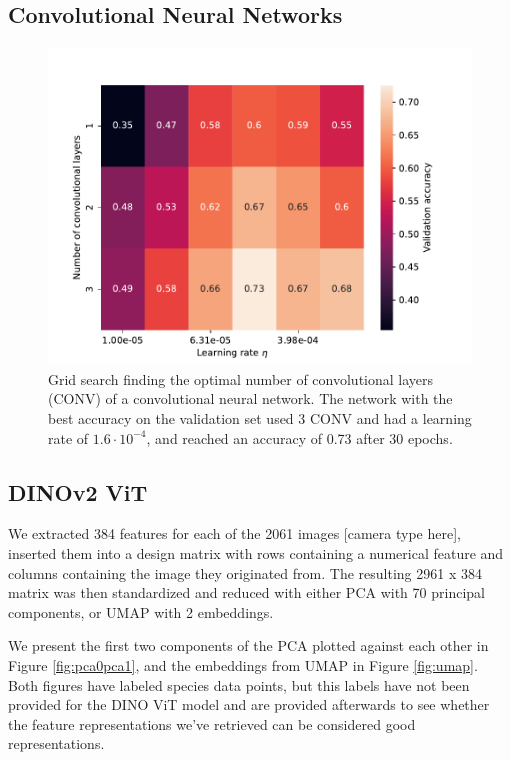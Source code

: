 
\subsection{Convolutional Neural Networks}

\begin{figure}
    \centering
    \includegraphics[width=0.5\linewidth]{examples/tests_even/figs/gridsearch-nconv-128-2024-12-12_1108.pdf}
    \caption{Grid search finding the optimal number of convolutional layers (CONV) of a convolutional neural network. The network with the best accuracy on the validation set used 3 CONV and had a learning rate of $1.6 \cdot 10^{-4}$, and reached an accuracy of 0.73 after 30 epochs.}
    \label{fig:gridsearch-nconv}
\end{figure}

\begi

%
%
\subsection{DINOv2 ViT}
We extracted 384 features for each of the 2061 images [camera type here], inserted them into a design matrix with rows containing a numerical feature and columns containing the image they originated from. The resulting 2961 x 384 matrix was then standardized and reduced with either PCA with 70 principal components, or UMAP with 2 embeddings. 

We present the first two components of the PCA plotted against each other in Figure \ref{fig:pca0pca1}, and the embeddings from UMAP in Figure \ref{fig:umap}. Both figures have labeled species data points, but this labels have not been provided for the DINO ViT model and are provided afterwards to see whether the feature representations we've retrieved can be considered good representations.

